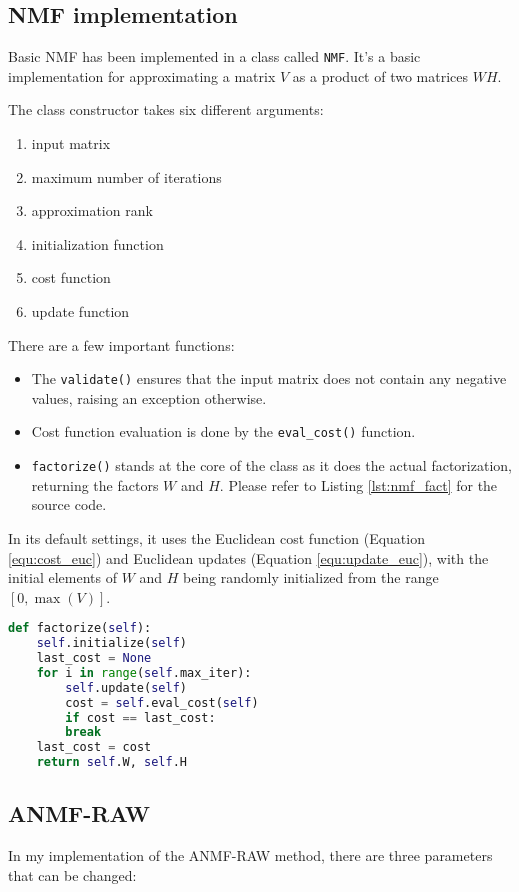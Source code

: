 \subsection{NMF implementation}
Basic NMF has been implemented in a class called \verb|NMF|. It's a basic implementation for approximating a matrix $V$ as a product of two matrices $WH$.

The class constructor takes six different arguments:

\begin{enumerate}
	\item input matrix
	\item maximum number of iterations
	\item approximation rank
	\item initialization function
	\item cost function
	\item update function
\end{enumerate}

There are a few important functions:

\begin{itemize}
\item The \verb|validate()| ensures that the input matrix does not contain any negative values, raising an exception otherwise.
\item Cost function evaluation is done by the \verb|eval_cost()| function.
\item \verb|factorize()| stands at the core of the class as it does the actual factorization, returning the factors $W$ and $H$. Please refer to Listing \ref{lst:nmf_fact} for the source code.
\end{itemize}

In its default settings, it uses the Euclidean cost function (Equation \ref{equ:cost_euc}) and Euclidean updates (Equation \ref{equ:update_euc}), with the initial elements of $W$ and $H$ being randomly initialized from the range $[0, \max(V)]$.

\begin{lstlisting}[caption={Python code for the factorize function}, language=Python, label={lst:nmf_fact}]
def factorize(self):
	self.initialize(self)
	last_cost = None
	for i in range(self.max_iter):
		self.update(self)
		cost = self.eval_cost(self)
		if cost == last_cost:
		break
	last_cost = cost
	return self.W, self.H
\end{lstlisting}

\subsection{ANMF-RAW}
In my implementation of the ANMF-RAW method, there are three parameters that can be changed:

